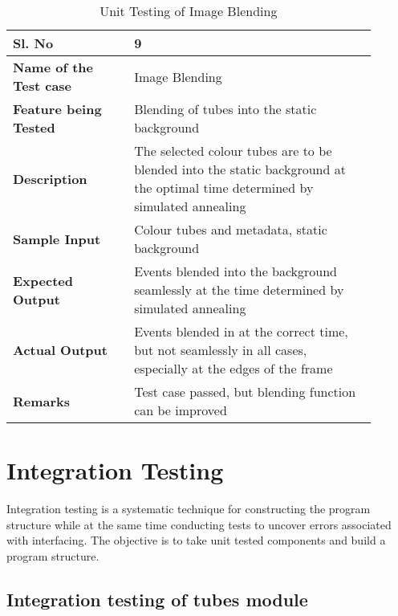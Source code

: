         \FloatBarrier
        \begin{table}[H]
            \caption{Unit Testing of Image Blending}
            \begin{tabular}{|p{0.3\linewidth}|p{0.6\linewidth}|}
                \hline
                \textbf{Sl. No }              &\textbf{ 9}\\
                \hline
                \textbf{Name of the Test case}& Image Blending \\
                \hline
                \textbf{Feature being Tested}  & Blending of tubes into the
                static background \\
                \hline
                \textbf{Description}           & The selected colour tubes are
                to be blended into the static background at the optimal time
                determined by simulated annealing \\
                \hline
                \textbf{Sample Input}          & Colour tubes and metadata,
                static background \\
                \hline
                \textbf{Expected Output}       & Events blended into the
                background seamlessly at the time determined by simulated annealing \\
                \hline
                \textbf{Actual Output}         & Events blended in at the
                correct time, but not seamlessly in all cases, especially at
                the edges of the frame \\
                \hline
                \textbf{Remarks }              & Test case passed, but blending
                function can be improved \\
                \hline
            \end{tabular}
            \label{table:unit-image-blending}
        \end{table}

\section{Integration Testing}

Integration testing is a systematic technique for constructing the program
structure while at the same time conducting tests to uncover errors associated
with interfacing. The objective is to take unit tested components and build a
program structure.

    \subsection{Integration testing of tubes module}

